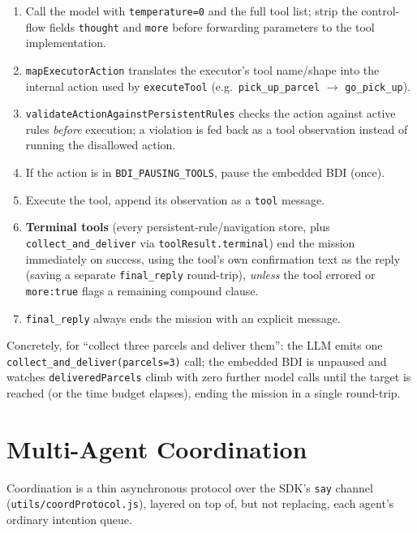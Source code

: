 \documentclass[11pt,a4paper]{article}
\begin{document}
\begin{enumerate}
  \item Call the model with \texttt{temperature=0} and the full tool list; strip the
  control-flow fields \texttt{thought} and \texttt{more} before forwarding parameters to the
  tool implementation.
  \item \texttt{mapExecutorAction} translates the executor's tool name/shape into the internal
  action used by \texttt{executeTool} (e.g.\ \texttt{pick\_up\_parcel} $\to$ \texttt{go\_pick\_up}).
  \item \texttt{validateActionAgainstPersistentRules} checks the action against active rules
  \emph{before} execution; a violation is fed back as a tool observation instead of running the
  disallowed action.
  \item If the action is in \texttt{BDI\_PAUSING\_TOOLS}, pause the embedded BDI (once).
  \item Execute the tool, append its observation as a \texttt{tool} message.
  \item \textbf{Terminal tools} (every persistent-rule/navigation store, plus
  \texttt{collect\_and\_deliver} via \texttt{toolResult.terminal}) end the mission immediately on
  success, using the tool's own confirmation text as the reply (saving a separate
  \texttt{final\_reply} round-trip), \emph{unless} the tool errored or \texttt{more:true} flags a
  remaining compound clause.
  \item \texttt{final\_reply} always ends the mission with an explicit message.
\end{enumerate}

Concretely, for ``collect three parcels and deliver them'': the LLM emits one
\texttt{collect\_and\_deliver(parcels=3)} call; the embedded BDI is unpaused and watches
\texttt{deliveredParcels} climb with zero further model calls until the target is reached (or the
time budget elapses), ending the mission in a single round-trip.

\section{Multi-Agent Coordination}
\label{sec:coordination}

Coordination is a thin asynchronous protocol over the SDK's \texttt{say} channel
(\texttt{utils/coordProtocol.js}), layered on top of, but not replacing, each agent's ordinary
intention queue.
\end{document}

